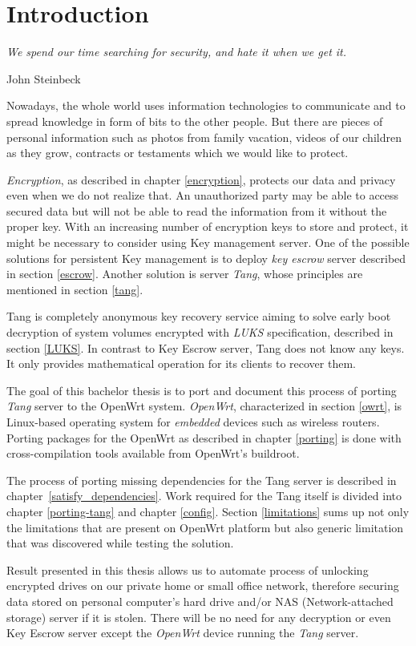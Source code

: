 \chapter{Introduction}\label{introduction}
\epigraph{\it We spend our time searching for security, and hate it when we get it.}{{John Steinbeck}\cite{quote}}

Nowadays, the whole world uses information technologies to communicate and to spread knowledge in form of bits to the other people.
But there are pieces of personal information such as photos from family vacation, videos of our children as they grow, contracts or testaments which we would like to protect.

{\it Encryption}, as described in chapter \ref{encryption}, protects our data and privacy even when we do not realize that.
An unauthorized party may be able to access secured data but will not be able to read the information from it without the proper key.
With an increasing number of encryption keys to store and protect, it might be necessary to consider using Key management server.
One of the possible solutions for persistent Key management is to deploy {\it key escrow} server described in section \ref{escrow}.
Another solution is server {\it Tang}, whose principles are mentioned in section \ref{tang}.

Tang is completely anonymous key recovery service aiming to solve early boot decryption of system volumes encrypted with {\it LUKS} specification, described in section \ref{LUKS}.
In contrast to Key Escrow server, Tang does not know any keys.
It only provides mathematical operation for its clients to recover them.

The goal of this bachelor thesis is to port and document this process of porting {\it Tang} server to the OpenWrt system.
{\it OpenWrt}, characterized in section \ref{owrt}, is Linux-based operating system for {\it embedded} devices such as wireless routers.
Porting packages for the OpenWrt as described in chapter \ref{porting} is done with cross-compilation tools available from OpenWrt's buildroot.

The process of porting missing dependencies for the Tang server is described in chapter~\ref{satisfy_dependencies}.
Work required for the Tang itself is divided into chapter \ref{porting-tang} and chapter \ref{config}.
Section \ref{limitations} sums up not only the limitations that are present on OpenWrt platform but also generic limitation that was discovered while testing the solution.

Result presented in this thesis allows us to automate process of unlocking encrypted drives on our private home or small office network, therefore securing data stored on personal computer's hard drive and/or NAS (Network-attached storage) server if it is stolen.
There will be no need for any decryption or even Key Escrow server except the {\it OpenWrt} device running the {\it Tang} server.
